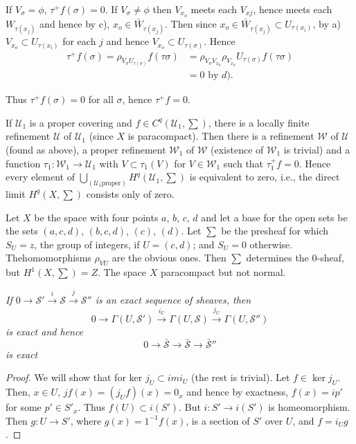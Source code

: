 If $V_ \sigma =\phi$, $\tau^+ f(\sigma)=0$. If $V_\sigma \neq \phi$
then $V_{x_o}$ meets each $V_{xj}$, hence meets each $W_{\tau (x_j)}$
and hence by c), $x_o \in \bar{W}_{\tau (x_j)}$. Then since $x_o \in
\bar {W}_{\tau (x_j)} \subset U_{\tau(x_i)}$, by a) $V_{x_o}\subset
U_{\tau (x_i)}$ for each $j$ and hence $V_{x_o}\subset U_{\tau
  (\sigma)}$. Hence 
\begin{align*}
\tau ^+ f(\sigma)= \rho_{V_\sigma U_{\tau(\sigma)}} f(\tau \sigma) & =
\rho_{V_\sigma V_{x_0}} \rho_{V_{x_0}} U_{\tau (\sigma)} f(\tau
\sigma)\\ 
&=0 \text{ by } d).
\end{align*}

Thus $\tau^+ f(\sigma)=0$ for all $\sigma$, hence $\tau ^+ f=0$.

If $\mathscr{U}_1$ is a proper covering and $f \in C^q (\mathscr{U}_1,
\sum)$, there is a locally finite refinement $\mathscr{U}$ of
$\mathscr{U}_1$ (since $X$ is paracompact). Then there is a refinement
$\mathscr{W}$ of $\mathscr{U}$ (found as above), a proper refinement
$\mathscr{W}_1$ of $\mathscr{W}$ (existence of $\mathscr{W}_1$ is
trivial) and a function $\tau _1:\mathscr{W}_1 \to \mathscr{U}_1$ with
$V \subset \tau_1 (V)$ for $V \in \mathscr{W}_1$ such that $\tau^+_1
f=0$. Hence every element of $\bigcup \limits_{(\mathscr{U}_1
  \text{proper})}H^q (\mathscr{U}_1 ,\sum)$ is equivalent to zero,
i.e., the direct limit $H^q(X, \sum)$ consists only of zero. 

\begin{exam}%
Let $X$ be the space with four points $a$, $b$, $c$, $d$ and let a
base for the 
open sets be the sets $(a,c,d)$, $(b,c,d)$, $(c)$, $(d)$. Let $\sum$ be the
presheaf for which $S_U=z$, the group  of integers, if $U=(c,d)$; and
$S_U=0$ otherwise. The\pageoriginale homomorphisms $\rho_{VU}$ are the obvious
ones. Then $\sum$ determines the 0-sheaf, but $H^1(X,\sum)=Z$. The
space $X$ paracompact but not normal. 
\end{exam}

\textit{If $0 \to \mathscr{S}' \xrightarrow{i}
  \mathscr{S}\xrightarrow{j} \mathscr{S}''$ is an exact sequence of
  sheaves, then} 
$$
0 \to \Gamma(U,\mathscr{S}') \xrightarrow{i_U}\Gamma (U,
\mathscr{S})\xrightarrow{j_U}\Gamma (U, \mathscr{S}'') 
$$
\textit{is exact and hence} 
$$
0 \to \bar{\mathscr{S}} \to \bar{\mathscr{S}} \to \bar{\mathscr{S}}'' 
$$
\textit{is exact}

\begin{proof}
We will show that for ker $j_U\subset im i_U$ (the rest is
trivial). Let $f \in \ker j_U$. Then, $x \in U$, $jf (x)=(j_Uf)(x)=0_x$
and hence by exactness, $f(x)=ip'$ for some $p' \in S'_x$. Thus
$f(U)\subset i(S')$. But $i:S' \to i(S')$ is homeomorphism. Then $g:U
\to S'$, where $g(x)=1^{-1}f(x)$, is a section of $S'$ over $U$, and
$f=i_U g$.  
\end{proof}

